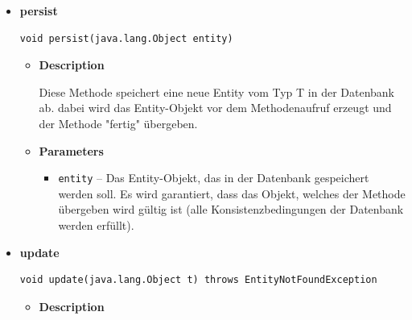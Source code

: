\documentclass[11pt,a4paper]{article}
\begin{document}
{{{{{{{{\begin{itemize}
{\begin{itemize}
{Diese Methode gibt ein Entity-Objekt zurück, das anhand seines Primärschlüssels aus der Datenbank geholt wurde.
}
\item{
{\bf  Parameters}
  \begin{itemize}
   \item{
\texttt{key} -- Der Primärschlüssel der Entity, die aus der Datenbank geholt werden soll. Der Datentyp wird von dem Generic PK bestimmt, mit dem das Interface implementiert wird.}
  \end{itemize}
}%
\item{{\bf  Returns} -- 
Ein Entity-Objekt, das durch den Schlüssel identifiziert wurde. Konnte keine passende Entity in der Datenbank gefunden werden, gibt die Methode null zurück. 
}%
\end{itemize}
}%
\item{ 
\hypertarget{edu.kit.pse17.go_app.PersistenceLayer.daos.AbstractDao.persist(T)}{{\bf  persist}\\}
\begin{lstlisting}[frame=none]
void persist(java.lang.Object entity)\end{lstlisting} %
\begin{itemize}
\item{
{\bf  Description}

Diese Methode speichert eine neue Entity vom Typ T in der Datenbank ab. dabei wird das Entity-Objekt vor dem Methodenaufruf erzeugt und der Methode "fertig" übergeben.
}
\item{
{\bf  Parameters}
  \begin{itemize}
   \item{
\texttt{entity} -- Das Entity-Objekt, das in der Datenbank gespeichert werden soll. Es wird garantiert, dass das Objekt, welches der Methode übergeben wird gültig ist (alle Konsistenzbedingungen der Datenbank werden erfüllt).}
  \end{itemize}
}%
\end{itemize}
}%
\item{ 
\hypertarget{edu.kit.pse17.go_app.PersistenceLayer.daos.AbstractDao.update(T)}{{\bf  update}\\}
\begin{lstlisting}[frame=none]
void update(java.lang.Object t) throws EntityNotFoundException\end{lstlisting} %
\begin{itemize}
\item{
{\bf  Description}

}
\end{itemize}}
\end{itemize}}}}}}}}}
\end{document}
